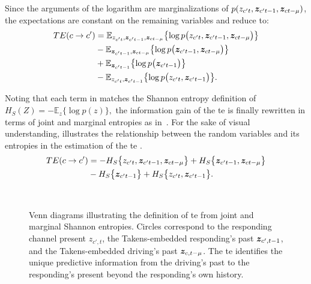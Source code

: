 Since the arguments of the logarithm are marginalizations of $p(z_{c't},{\bm{z}}_{c't-1},{\bm{z}}_{ct-\mu})$, the expectations are constant on the remaining variables and reduce to:
\begin{align}
 TE(c \to c') &= \mathbb{E}_{z_{c't},{\bm{z}}_{c't-1},{\bm{z}}_{ct-\mu}}
      \bigl\{\log p\bigl(z_{c't},{\bm{z}}_{c't-1},{\bm{z}}_{ct-\mu}\bigr)\bigr\} \label{eq:TE_02}\\
      &-\mathbb{E}_{{\bm{z}}_{c't-1},{\bm{z}}_{ct-\mu}}
      \bigl\{\log p\bigl({\bm{z}}_{c't-1},{\bm{z}}_{ct-\mu}\bigr)\bigr\}\nonumber\\
      &+\mathbb{E}_{{\bm{z}}_{c't-1}}
      \bigl\{\log p\bigl({\bm{z}}_{c't-1}\bigr)\bigr\}\nonumber\\
      &-\mathbb{E}_{z_{c't},{\bm{z}}_{c't-1}}
      \bigl\{\log p\bigl(z_{c't},{\bm{z}}_{c't-1}\bigr)\bigr\}.\nonumber
\end{align}

Noting that each term in  matches the Shannon entropy definition of $H_S(Z)=-\mathbb{E}_{z}\{\log p(z)\},$ the information gain of the \gls{te}  is finally rewritten in terms of joint and marginal entropies as in~. For the sake of visual understanding,  illustrates the relationship between the random variables and its entropies in the estimation of the \gls{te} .
\begin{align}
  TE(c \to c') &= -H_S\bigl\{z_{c't},{\bm{z}}_{c't-1},{\bm{z}}_{ct-\mu}\bigr\}
  +H_S\bigl\{{\bm{z}}_{c't-1},{\bm{z}}_{ct-\mu}\bigr\}\label{eq:TE_03}\\
  &-H_S\bigl\{{\bm{z}}_{c't-1}\bigr\}+H_S\bigl\{z_{c't},{\bm{z}}_{c't-1}\bigr\}.\nonumber
\end{align}
\begin{figure}[htbp]
  \centering
  \\
  \caption{Venn diagrams illustrating the definition of \gls{te}  from joint and marginal Shannon entropies. Circles correspond to the responding channel present $z_{c',t}$, the Takens-embedded responding's past ${\bm{z}}_{c',t-1}$, and the Takens-embedded driving's past ${\bm{z}}_{c,t-\mu}$. The \gls{te}  identifies the unique predictive information from the driving's past to the responding's present beyond the responding's own history.}
  \label{fig:venn}
\end{figure}

